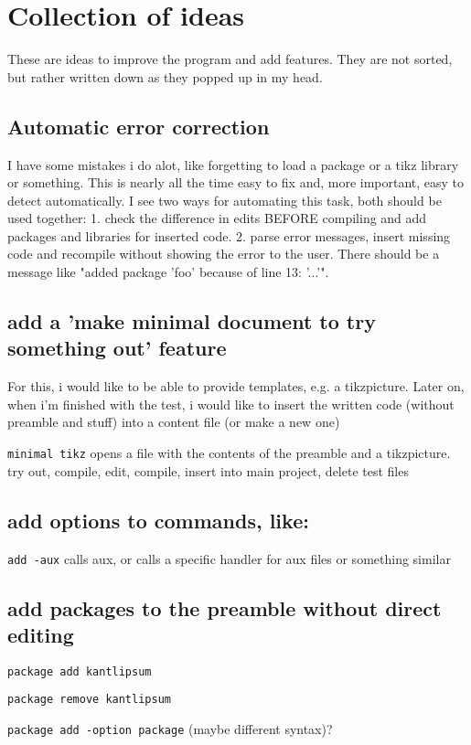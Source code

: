 \documentclass[parskip=half]{scrartcl}
\begin{document}
\section{Collection of ideas}
These are ideas to improve the program and add features. They are not sorted, but rather written down as they popped up in my head.
  \subsection{Automatic error correction}
  I have some mistakes i do alot, like forgetting to load a package or a tikz library or something. This is nearly all the time easy to fix and, more
  important, easy to detect automatically. I see two ways for automating this task, both should be used together: 1. check the difference in edits BEFORE
  compiling and add packages and libraries for inserted code. 2. parse error messages, insert missing code and recompile without showing the error to the
  user. There should be a message like "added package 'foo' because of line 13: '...'".

  \subsection{add a 'make minimal document to try something out' feature}
    For this, i would like to be able to provide templates, e.g. a tikzpicture.
    Later on, when i'm finished with the test, i would like to insert the written code (without preamble and stuff) into a content file (or make a new one)

    \texttt{minimal tikz} opens a file with the contents of the preamble and a tikzpicture. try out, compile, edit, compile, insert into main project, delete test
       files

       \subsection{add options to commands, like:}
       \texttt{add -aux} calls aux, or calls a specific handler for aux files or something similar

    \subsection{add packages to the preamble without direct editing}
    \texttt{package add kantlipsum}

    \texttt{package remove kantlipsum}

    \texttt{package add -option package} (maybe different syntax)?
\end{document}
